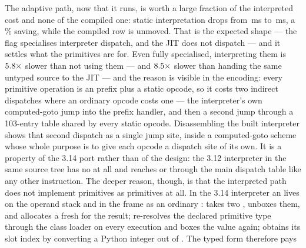The adaptive path, now that it runs, is worth a large fraction of the interpreted cost and none
of the compiled one: static interpretation drops from \,ms to \,ms, a \,\% saving,
while the compiled row is unmoved. That is the expected shape --- the
flag specialises interpreter dispatch, and the JIT does not dispatch --- and it settles what the
primitives are for. Even fully specialised, interpreting them is $\meas{ratio:b6_static-fork_static_adaptive:matmul96_int/fork_static_adaptive/static_interp|b6_static-fork_static_adaptive:matmul96_int/fork_static_adaptive/boxed_python}{5.8}\times$ slower than not
using them --- and $\meas{ratio:b6_static-fork_static_adaptive:matmul96_int/fork_static_adaptive/static_interp|b6_static-fork_static_adaptive:matmul96_int/fork_static_adaptive/boxed_jit}{8.5}\times$ slower than handing the same untyped source to the JIT --- and
the reason is visible in the encoding: every primitive operation is an
 prefix plus a static opcode, so it costs two indirect dispatches where an
ordinary opcode costs one --- the interpreter's own computed-goto jump into the prefix handler,
and then a second jump through a 103-entry table shared by every static opcode. Disassembling the
built interpreter shows that second dispatch as a single jump site, inside a computed-goto scheme
whose whole purpose is to give each opcode a dispatch site of its own. It is a property of the
3.14 port rather than of the design: the 3.12 interpreter in the same source tree has no
 at all and reaches  or 
through the main dispatch table like any other instruction. The deeper reason, though, is that
the interpreted path does not implement primitives as primitives at all. In the 3.14 interpreter
an  lives on the operand stack and in the frame as an ordinary :
 takes two , unboxes them, and allocates a fresh
 for the result;  re-resolves the declared primitive type through
the class loader on every execution and boxes the value again;  obtains its
slot index by converting a Python integer out of . The typed form therefore pays
